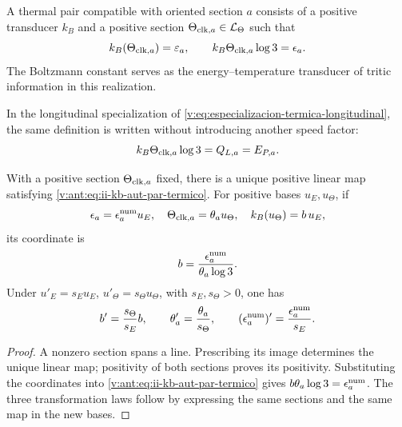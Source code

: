 \begin{definition}
A thermal pair compatible with oriented section \(a\) consists of
a positive transducer \(k_B\) and a positive section
\(\Theta_{{\rm clk},a}\in\mathcal L_\Theta\) such that
\begin{equation}
 k_B(\Theta_{{\rm clk},a})=\varepsilon_a,
 \qquad
 k_B\Theta_{{\rm clk},a}\log3=\epsilon_a.
 \label{v:ant:eq:ii-kb-aut-par-termico}
\end{equation}
The Boltzmann constant serves as the energy--temperature
transducer of tritic information in this realization.
\end{definition}

In the longitudinal specialization of
\eqref{v:eq:especializacion-termica-longitudinal}, the same definition is
written without introducing another speed factor:
\begin{equation}
 k_B\Theta_{{\rm clk},a}\log3=Q_{L,a}=E_{P,a}.
 \label{v:eq:transduccion-termica-longitudinal}
\end{equation}

\begin{theorem}
With a positive section \(\Theta_{{\rm clk},a}\) fixed, there is a
unique positive linear map satisfying
\eqref{v:ant:eq:ii-kb-aut-par-termico}. For positive bases \(u_E,u_\Theta\),
if
\[
 \epsilon_a=\epsilon_a^{\rm num}u_E,\quad
 \Theta_{{\rm clk},a}=\theta_a u_\Theta,\quad
 k_B(u_\Theta)=b\,u_E,
\]
its coordinate is
\begin{equation}
 b=\frac{\epsilon_a^{\rm num}}{\theta_a\log3}.
 \label{v:ant:eq:ii-kb-aut-coordenada}
\end{equation}
Under \(u'_E=s_Eu_E\), \(u'_\Theta=s_\Theta u_\Theta\), with
\(s_E,s_\Theta>0\), one has
\[
 b'=\frac{s_\Theta}{s_E}b,\qquad
 \theta'_a=\frac{\theta_a}{s_\Theta},\qquad
 (\epsilon_a^{\rm num})'=\frac{\epsilon_a^{\rm num}}{s_E}.
\]
\end{theorem}
\begin{proof}
A nonzero section spans a line. Prescribing its image determines
the unique linear map; positivity of both sections proves
its positivity. Substituting the coordinates into
\eqref{v:ant:eq:ii-kb-aut-par-termico} gives
\(b\theta_a\log3=\epsilon_a^{\rm num}\). The three transformation
laws follow by expressing the same sections and the same
map in the new bases.
\end{proof}

